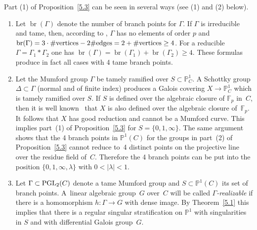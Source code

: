 \documentclass[pdftex]{sigma}
\numberwithin{equation}{section}
\begin{document}
\begin{Comments}\label{5.4} Part (1) of Proposition~\ref{5.3} can be seen in several ways (see (1) and (2) below).
\begin{enumerate}\itemsep=0pt
\item[(1)] Let $\operatorname{br}(\Gamma)$ denote the number of branch points for $\Gamma$. If $\Gamma$ is irreducible and tame, then, according to \cite[Theorem~3.1 and Section~9.1]{Vo-vdP}, $\Gamma$ has no elements of order $p$ and $\operatorname{br}(\Gamma)=3\cdot \# {\rm vertices}-2\#{\rm edges}=2+\# {\rm vertices}\geq 4$. For a reducible $\Gamma=\Gamma_1\ast \Gamma_2$ one has $\operatorname{br}(\Gamma)=\operatorname{br}(\Gamma_1)+\operatorname{br}(\Gamma_2)\geq 4$. These formulas produce in fact all cases with 4 tame branch points.
\item[(2)] Let the Mumford group $\Gamma$ be tamely ramified over $S\subset \mathbb{P}_C^1$. A Schottky group $\Delta \subset \Gamma$ (normal and of finite index) produces a Galois covering $X\rightarrow \mathbb{P}^1_C$ which is tamely ramified over $S$. If $S$ is defined over the algebraic closure of $\mathbb{F}_p$ in~$C$, then it is well known~\cite[Expos\'e~IX]{SGA1} that $X$ is also defined over the algebraic closure of~$\mathbb{F}_p$. It follows that $X$ has good reduction and cannot be a Mumford curve. This implies part~(1) of Proposition~\ref{5.3} for $S=\{0,1,\infty\}$.
The same argument shows that the 4 branch points in $\mathbb{P}^1(C)$ for the groups in part~(2) of Proposition~\ref{5.3} cannot reduce to~4 distinct points on the projective line over the residue field of~$C$. Therefore the 4 branch points can be put into the position $\{0,1,\infty, \lambda \}$ with $0<|\lambda |<1$.

\item[(3)] Let $\Gamma\subset {\rm PGL}_2(C)$ denote a tame Mumford group and $S\subset \mathbb{P}^1(C)$ its set of branch points. A~linear algebraic group~$G$ over~$C$ will be called {\it $\Gamma$-realizable} if there is a homomorphism $h\colon \Gamma \rightarrow G$ with dense image. By Theorem~\ref{5.1} this implies that there is a regular singular stratification on $\mathbb{P}^1$ with singularities in $S$ and with differential Galois group~$G$.
\end{enumerate}
\end{Comments}
\end{document}
